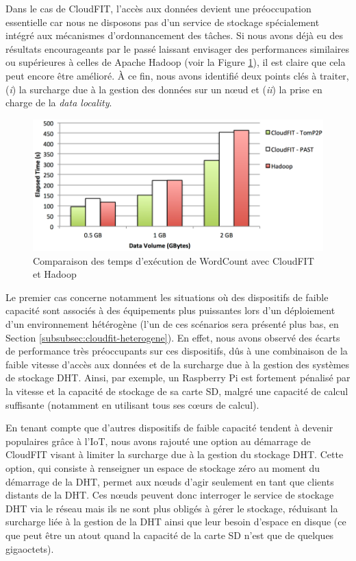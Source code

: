 Dans le cas de CloudFIT, l'accès aux données devient une préoccupation essentielle car nous ne disposons pas d'un service de stockage spécialement intégré aux mécanismes d'ordonnancement des tâches. Si nous avons déjà eu des résultats encourageants par le passé \cite{Steffenel2015Roma} laissant envisager des performances similaires ou supérieures à celles de Apache Hadoop (voir la Figure \ref{fig:Hadoop}), il est claire que cela peut encore être amélioré. À ce fin, nous avons identifié deux points clés à traiter, (\textit{i}) la surcharge due à la gestion des données sur un n{\oe}ud et (\textit{ii}) la prise en charge de la \textit{data locality}. 

\begin{figure}[!ht]
	\centering
	\includegraphics[width=0.65\linewidth]{img/CloudFIT-mesures.pdf}
	\caption{Comparaison des temps d'exécution de WordCount avec CloudFIT et Hadoop}
	\label{fig:Hadoop}
\end{figure}

Le premier cas concerne notamment les situations où des dispositifs de faible capacité sont associés à des équipements plus puissantes lors d'un déploiement d'un environnement hétérogène (l'un de ces scénarios sera présenté plus bas, en Section \ref{subsubsec:cloudfit-heterogene}). En effet, nous avons observé des écarts de performance très préoccupants sur ces dispositifs, dûs à une combinaison de la faible vitesse d'accès aux données et de la surcharge due à la gestion des systèmes de stockage DHT. Ainsi, par exemple, un Raspberry Pi est fortement pénalisé par la vitesse et la capacité de stockage de sa carte SD, malgré une capacité de calcul suffisante (notamment en utilisant tous ses c{\oe}urs de calcul). 

En tenant compte que d'autres dispositifs de faible capacité tendent à devenir populaires grâce à l'IoT, nous avons rajouté une option au démarrage de CloudFIT visant à limiter la surcharge due à la gestion du stockage DHT. Cette option, qui consiste à renseigner un espace de stockage zéro au moment du démarrage de la DHT, permet aux n{\oe}uds d'agir seulement en tant que clients distants de la DHT. Ces n{\oe}uds peuvent donc interroger le service de stockage DHT via le réseau mais ils ne sont plus obligés à gérer le stockage, réduisant la surcharge liée à la gestion de la DHT ainsi que leur besoin d'espace en disque (ce que peut être un atout quand la capacité de la carte SD n'est que de quelques gigaoctets).

